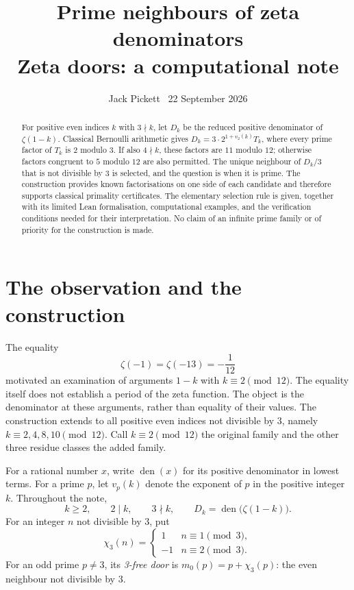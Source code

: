 \documentclass[11pt,a4paper]{article}
\title{Prime neighbours of zeta denominators\\[4pt]\large Zeta doors: a computational note}
\author{Jack Pickett \textperiodcentered\ 22 September 2026}
\date{}
\newcommand{\den}{\operatorname{den}}
\begin{document}
\maketitle
\begin{abstract}
For positive even indices $k$ with $3\nmid k$, let $D_k$ be the reduced
positive denominator of $\zeta(1-k)$. Classical Bernoulli arithmetic gives
$D_k=3\cdot2^{1+v_2(k)}T_k$, where every prime factor of $T_k$ is $2$
modulo $3$. If also $4\nmid k$, these factors are $11$ modulo $12$;
otherwise factors congruent to $5$ modulo $12$ are also permitted. The unique neighbour of $D_k/3$ that is not divisible by
$3$ is selected, and the question is when it is prime. The construction provides known
factorisations on one side of each candidate and therefore supports
classical primality certificates. The elementary selection rule is given,
together with its limited Lean formalisation, computational examples,
and the verification conditions needed for their interpretation. No claim
of an infinite prime family or of priority for the construction is made.
\end{abstract}

\section{The observation and the construction}
The equality
\[
 \zeta(-1)=\zeta(-13)=-\frac1{12}
\]
motivated an examination of arguments $1-k$ with $k\equiv2\pmod{12}$.
The equality itself does not establish a period of the zeta function.
The object is the denominator at these arguments, rather than equality
of their values. The construction extends to all positive even indices
not divisible by $3$, namely $k\equiv2,4,8,10\pmod{12}$. Call
$k\equiv2\pmod{12}$ the original family and the other three residue
classes the added family.

For a rational number $x$, write $\den(x)$ for its positive denominator
in lowest terms. For a prime $p$, let $v_p(k)$ denote the exponent of $p$
in the positive integer $k$. Throughout the note,
\[
 k\ge2,\qquad 2\mid k,\qquad 3\nmid k,\qquad
 D_k=\den\bigl(\zeta(1-k)\bigr).
\]
For an integer $n$ not divisible by $3$, put
\[
 \chi_3(n)=\begin{cases}1&n\equiv1\pmod3,\\-1&n\equiv2\pmod3.
 \end{cases}
\]
For an odd prime $p\ne3$, its \emph{3-free door} is
$m_0(p)=p+\chi_3(p)$: the even neighbour not divisible by $3$.
\end{document}
